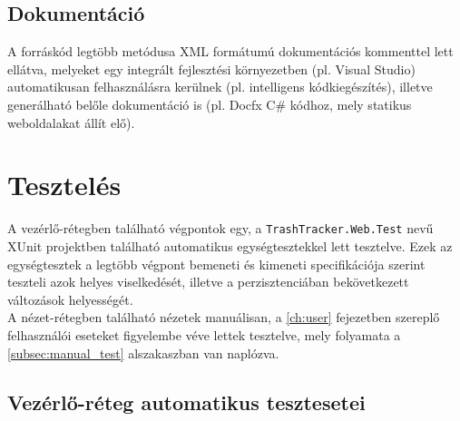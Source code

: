 \subsection{Dokumentáció}

A forráskód legtöbb metódusa XML formátumú dokumentációs kommenttel lett ellátva, melyeket egy integrált fejlesztési környezetben (pl. Visual Studio) automatikusan felhasználásra kerülnek (pl. intelligens kódkiegészítés), illetve generálható belőle dokumentáció is (pl. Docfx C\# kódhoz, mely statikus weboldalakat állít elő).

\section{Tesztelés}

A vezérlő-rétegben található végpontok egy, a \texttt{TrashTracker.Web.Test} nevű XUnit projektben található automatikus egységtesztekkel lett tesztelve. Ezek az egységtesztek a legtöbb végpont bemeneti és kimeneti specifikációja szerint teszteli azok helyes viselkedését, illetve a perzisztenciában bekövetkezett változások helyességét.\\
A nézet-rétegben található nézetek manuálisan, a \ref{ch:user} fejezetben szereplő felhasználói eseteket figyelembe véve lettek tesztelve, mely folyamata a \ref{subsec:manual_test} alszakaszban van naplózva.

\subsection{Vezérlő-réteg automatikus tesztesetei}

